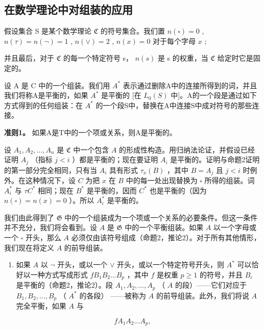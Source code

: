\subsection{在数学理论中对组装的应用}

假设集合 S 是某个数学理论 \(\mathfrak{C}\) 的符号集合。我们置 \(n(\square) = 0\) , \(n(\tau) = n(\neg) = 1\) , \(n(\vee) = 2\) , \(n(x) = 0\) 对于每个字母 \(x\) ;

并且最后，对于 \(\mathfrak{C}\) 的每一个特定符号 s， \(n(s)\) 是 s 的权重，当 \(\mathfrak{C}\) 给定时它是固定的。

设 A 是 C 中的一个组装。我们用 \(A^{*}\) 表示通过删除A中的连接所得到的词，并且我们将称A是平衡的，如果 \(A^{*}\) 是平衡的 {[}在 \(L_{0}(S)\) 中{]}。A的一个段是通过如下方式得到的任何组装：在 \(A^{*}\) 的一个段S中，替换在A中连接S中成对符号的那些连接。

\textbf{准则1。} 如果A是T中的一个项或关系，则A是平衡的。

设 \(A_1, A_2, \ldots, A_n\) 是 \(\mathfrak{C}\) 中一个包含 \(A\) 的形成性构造。用归纳法论证，并假设已经证明 \(A_j\) （指标 \(j < i\) ）都是平衡的；现在要证明 \(A_i\) 是平衡的。证明与命题2证明的第一部分完全相同，只有当 \(A_i\) 具有形式 \(\tau_x(B)\) ，其中 \(B = A_j\) 且 \(j < i\) 时例外。在这种情况下，设 \(C\) 为把 \(x\) 在 \(B\) 中的每一处出现替换为 \(\square\) 所得的组装。词 \(A_i^*\) 与 \(\tau C^*\) 相同；现在 \(B^*\) 是平衡的，因而 \(C^*\) 也是平衡的（因为 \(n(\square) = n(x) = 0\) ）。所以 \(A_i^*\) 是平衡的。

我们由此得到了 \(\mathfrak{G}\) 中的一个组装成为一个项或一个关系的必要条件。但这一条件并不充分，我们将会看到。设 \(A\) 是 \(\mathfrak{G}\) 中的一个平衡组装。如果 \(A\) 以一个字母或一个 \(\square\) 开头，那么 \(A\) 必须仅由该符号组成（命题2，推论2）。对于所有其他情形，我们现在将定义 \(A\) 的前导组装。

\begin{enumerate}
\def\labelenumi{(\arabic{enumi})}
\tightlist
\item
  如果 \(A\) 以 \(\lnot\) 开头，或以一个 \(\vee\) 开头，或以一个特定符号开头，则 \(A^*\) 可以恰好以一种方式写成形式 \(fB_1B_2\ldots B_p\) ，其中 \(f\) 是权重 \(p \geqslant 1\) 的符号，并且 \(B_i\) 是平衡的（命题2，推论2）。段 \(A_1, A_2, \ldots, A_p\) （ \(A\) 的段）——它们对应于 \(B_1, B_2, \ldots, B_p\) （ \(A^*\) 的各段） ——被称为 \(A\) 的前导组装。此外，我们将说 \(A\) 完全平衡，如果 \(A\) 与
\end{enumerate}

\[
f A _ {1} A _ {2} \dots A _ {p},
\]

